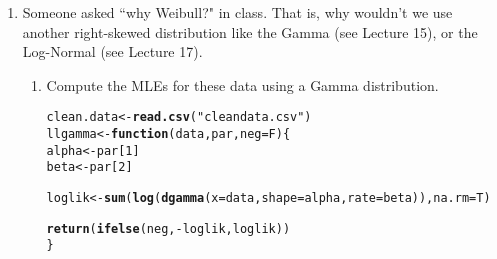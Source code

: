 \documentclass{article}\usepackage[]{graphicx}\usepackage[]{xcolor}
\makeatletter
\newcommand{\hlnum}[1]{\textcolor[rgb]{0.686,0.059,0.569}{#1}}%
\newcommand{\hlsng}[1]{\textcolor[rgb]{0.192,0.494,0.8}{#1}}%
\newcommand{\hlopt}[1]{\textcolor[rgb]{0,0,0}{#1}}%
\newcommand{\hldef}[1]{\textcolor[rgb]{0.345,0.345,0.345}{#1}}%
\newcommand{\hlkwa}[1]{\textcolor[rgb]{0.161,0.373,0.58}{\textbf{#1}}}%
\newcommand{\hlkwb}[1]{\textcolor[rgb]{0.69,0.353,0.396}{#1}}%
\newcommand{\hlkwc}[1]{\textcolor[rgb]{0.333,0.667,0.333}{#1}}%
\newcommand{\hlkwd}[1]{\textcolor[rgb]{0.737,0.353,0.396}{\textbf{#1}}}%
\newenvironment{kframe}{%
 \def\at@end@of@kframe{}%
 \ifinner\ifhmode%
  \def\at@end@of@kframe{\end{minipage}}%
  \begin{minipage}{\columnwidth}%
 \fi\fi%
 \def\FrameCommand##1{\hskip\@totalleftmargin \hskip-\fboxsep
 \colorbox{shadecolor}{##1}\hskip-\fboxsep
     \hskip-\linewidth \hskip-\@totalleftmargin \hskip\columnwidth}%
 \MakeFramed {\advance\hsize-\width
   \@totalleftmargin\z@ \linewidth\hsize
   \@setminipage}}%
 {\par\unskip\endMakeFramed%
 \at@end@of@kframe}
\newenvironment{knitrout}{}{} %
\makeatother
\begin{document}
\begin{enumerate}
  \item Someone asked ``why Weibull?" in class. That is, why wouldn't we use 
  another right-skewed distribution like the Gamma (see Lecture 15), or
  the Log-Normal (see Lecture 17).
  \begin{enumerate}
    \item Compute the MLEs for these data using a Gamma distribution. 
\begin{knitrout}\scriptsize
{}\color{fgcolor}\begin{kframe}
\begin{alltt}
\hldef{clean.data} \hlkwb{<-} \hlkwd{read.csv}\hldef{(}\hlsng{"cleandata.csv"}\hldef{)}
\hldef{llgamma} \hlkwb{<-} \hlkwa{function}\hldef{(}\hlkwc{data}\hldef{,} \hlkwc{par}\hldef{,} \hlkwc{neg}\hldef{=F)\{}
  \hldef{alpha} \hlkwb{<-} \hldef{par[}\hlnum{1}\hldef{]}
  \hldef{beta} \hlkwb{<-} \hldef{par[}\hlnum{2}\hldef{]}

  \hldef{loglik} \hlkwb{<-} \hlkwd{sum}\hldef{(}\hlkwd{log}\hldef{(}\hlkwd{dgamma}\hldef{(}\hlkwc{x}\hldef{=data,} \hlkwc{shape}\hldef{=alpha,} \hlkwc{rate}\hldef{=beta)),} \hlkwc{na.rm}\hldef{=T)}

  \hlkwd{return}\hldef{(}\hlkwd{ifelse}\hldef{(neg,} \hlopt{-}\hldef{loglik, loglik))}
\hldef{\}}


\end{alltt}
\end{kframe}
\end{knitrout}
\end{enumerate}
\end{enumerate}
\end{document}
